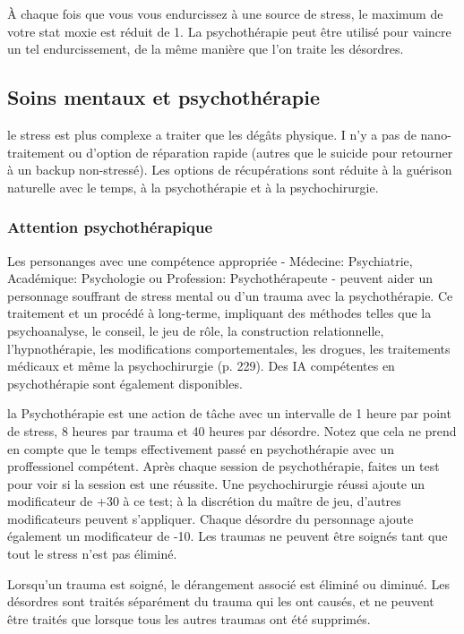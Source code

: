 À chaque fois que vous vous endurcissez à une source de stress, le maximum de votre stat moxie est réduit de 1. La psychothérapie peut être utilisé pour vaincre un tel endurcissement, de la même manière que l'on traite les désordres. 



\subsection{Soins mentaux et psychothérapie} \label{sec:mental-healing-psychotherapy} 

le stress est plus complexe a traiter que les dégâts physique. I n'y a pas de nano-traitement ou d'option de réparation rapide (autres que le suicide pour retourner à un backup non-stressé). Les options de récupérations sont réduite à la guérison naturelle avec le temps, à la psychothérapie et à la psychochirurgie. 

\subsubsection{Attention psychothérapique} 

Les personanges avec une compétence appropriée - Médecine: Psychiatrie, Académique: Psychologie ou Profession: Psychothérapeute - peuvent aider un personnage souffrant de stress mental ou d'un trauma avec la psychothérapie. Ce traitement et un procédé à long-terme, impliquant des méthodes telles que la psychoanalyse, le conseil, le jeu de rôle, la construction relationnelle, l'hypnothérapie, les modifications comportementales, les drogues, les traitements médicaux et même la psychochirurgie (p. 229). Des IA compétentes en psychothérapie sont également disponibles. 

la Psychothérapie est une action de tâche avec un intervalle de 1 heure par point de stress, 8 heures par trauma et 40 heures par désordre. Notez que cela ne prend en compte que le temps effectivement passé en psychothérapie avec un proffessionel compétent. Après chaque session de psychothérapie, faites un test pour voir si la session est une réussite. Une psychochirurgie réussi ajoute un modificateur de +30 à ce test; à la discrétion du maître de jeu, d'autres modificateurs peuvent s'appliquer. Chaque désordre du personnage ajoute également un modificateur de -10. Les traumas ne peuvent être soignés tant que tout le stress n'est pas éliminé. 

Lorsqu'un trauma est soigné, le dérangement associé est éliminé ou diminué. Les désordres sont traités séparément du trauma qui les ont causés, et ne peuvent être traités que lorsque tous les autres traumas ont été supprimés. 

